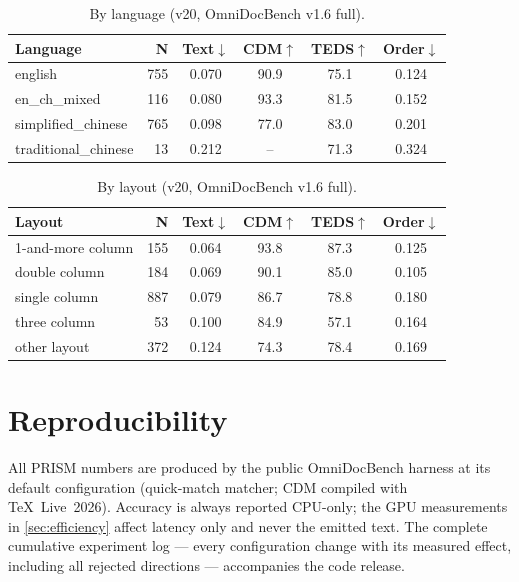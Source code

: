 \begin{table}[h]
\centering
\caption{By language (v20, OmniDocBench v1.6 full).}
\label{tab:suppl_lang}
\small
\setlength{\tabcolsep}{4pt}
\begin{tabular}{lrcccc}
\toprule
Language & N & Text$\downarrow$ & CDM$\uparrow$ & TEDS$\uparrow$ & Order$\downarrow$ \\
\midrule
english              & 755 & 0.070 & 90.9 & 75.1 & 0.124 \\
en\_ch\_mixed        & 116 & 0.080 & 93.3 & 81.5 & 0.152 \\
simplified\_chinese  & 765 & 0.098 & 77.0 & 83.0 & 0.201 \\
traditional\_chinese & 13 & 0.212 & --   & 71.3 & 0.324 \\
\bottomrule
\end{tabular}
\end{table}

\begin{table}[h]
\centering
\caption{By layout (v20, OmniDocBench v1.6 full).}
\label{tab:suppl_layout}
\small
\setlength{\tabcolsep}{4pt}
\begin{tabular}{lrcccc}
\toprule
Layout & N & Text$\downarrow$ & CDM$\uparrow$ & TEDS$\uparrow$ & Order$\downarrow$ \\
\midrule
1-and-more column & 155 & 0.064 & 93.8 & 87.3 & 0.125 \\
double column     & 184 & 0.069 & 90.1 & 85.0 & 0.105 \\
single column     & 887 & 0.079 & 86.7 & 78.8 & 0.180 \\
three column      & 53 & 0.100 & 84.9 & 57.1 & 0.164 \\
other layout      & 372 & 0.124 & 74.3 & 78.4 & 0.169 \\
\bottomrule
\end{tabular}
\end{table}

\section{Reproducibility}
\label{sec:suppl_repro}

All PRISM numbers are produced by the public OmniDocBench harness at its default configuration (quick-match matcher; CDM compiled with TeX~Live~2026). Accuracy is always reported CPU-only; the GPU measurements in \cref{sec:efficiency} affect latency only and never the emitted text. The complete cumulative experiment log --- every configuration change with its measured effect, including all rejected directions --- accompanies the code release.
